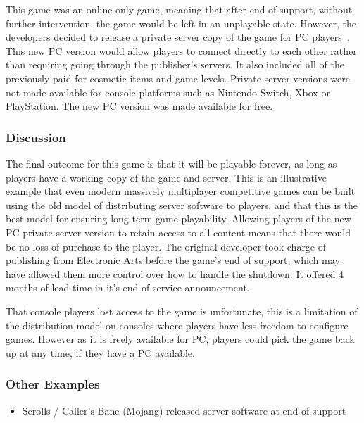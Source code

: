 This game was an online-only game, meaning that after end of support, without further intervention, the game would be left in an unplayable state.
However, the developers decided to release a private server copy of the game for PC players~\cite{knockout-private}.
This new PC version would allow players to connect directly to each other rather than requiring going through the publisher's servers.
It also included all of the previously paid-for cosmetic items and game levels.
Private server versions were not made available for console platforms such as Nintendo Switch, Xbox or PlayStation.
The new PC version was made available for free.

\subsubsection*{Discussion}
The final outcome for this game is that it will be playable forever, as long as players have a working copy of the game and server.
This is an illustrative example that even modern massively multiplayer competitive games can be built using the old model of distributing server software to players,
and that this is the best model for ensuring long term game playability.
Allowing players of the new PC private server version to retain access to all content means that there would be no loss of purchase to the player.
The original developer took charge of publishing from Electronic Arts before the game's end of support, which may have allowed them more control over how to handle the shutdown.
It offered 4 months of lead time in it's end of service announcement.

That console players lost access to the game is unfortunate, this is a limitation of the distribution model on consoles where players have less freedom to configure games.
However as it is freely available for PC, players could pick the game back up at any time, if they have a PC available.

\subsubsection*{Other Examples}
\begin{itemize}
    \item Scrolls / Caller's Bane (Mojang) released server software at end of support\cite{scrolls-server-2018}
\end{itemize}


